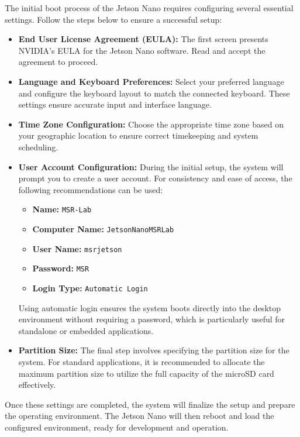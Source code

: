 The initial boot process of the Jetson Nano requires configuring several essential settings. Follow the steps below to ensure a successful setup:

\begin{itemize}
	\item \textbf{End User License Agreement (EULA):} The first screen presents NVIDIA's EULA for the Jetson Nano software. Read and accept the agreement to proceed.
	
	\item \textbf{Language and Keyboard Preferences:} Select your preferred language and configure the keyboard layout to match the connected keyboard. These settings ensure accurate input and interface language.
	
	\item \textbf{Time Zone Configuration:} Choose the appropriate time zone based on your geographic location to ensure correct timekeeping and system scheduling.
	
	\item \textbf{User Account Configuration:} During the initial setup, the system will prompt you to create a user account. For consistency and ease of access, the following recommendations can be used:
	\begin{itemize}
		\item \textbf{Name:} \texttt{MSR-Lab}
		\item \textbf{Computer Name:} \texttt{JetsonNanoMSRLab}
		\item \textbf{User Name:} \texttt{msrjetson}
		\item \textbf{Password:} \texttt{MSR}
		\item \textbf{Login Type:} \texttt{Automatic Login}
	\end{itemize}
	Using automatic login ensures the system boots directly into the desktop environment without requiring a password, which is particularly useful for standalone or embedded applications.
	
	\item \textbf{Partition Size:} The final step involves specifying the partition size for the system. For standard applications, it is recommended to allocate the maximum partition size to utilize the full capacity of the microSD card effectively.
\end{itemize}

Once these settings are completed, the system will finalize the setup and prepare the operating environment. The Jetson Nano will then reboot and load the configured environment, ready for development and operation.




